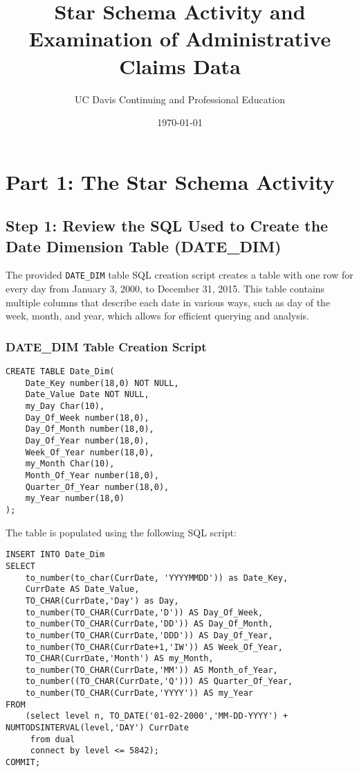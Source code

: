 \documentclass{article}
\title{Star Schema Activity and Examination of Administrative Claims Data}
\author{UC Davis Continuing and Professional Education}
\date{\today}
\begin{document}
\maketitle

\section*{Part 1: The Star Schema Activity}

\subsection*{Step 1: Review the SQL Used to Create the Date Dimension Table (DATE\_DIM)}

The provided \texttt{DATE\_DIM} table SQL creation script creates a table with one row for every day from January 3, 2000, to December 31, 2015. This table contains multiple columns that describe each date in various ways, such as day of the week, month, and year, which allows for efficient querying and analysis.

\subsubsection*{DATE\_DIM Table Creation Script}
\begin{verbatim}
CREATE TABLE Date_Dim(
    Date_Key number(18,0) NOT NULL,
    Date_Value Date NOT NULL,
    my_Day Char(10),
    Day_Of_Week number(18,0),
    Day_Of_Month number(18,0),
    Day_Of_Year number(18,0),
    Week_Of_Year number(18,0),
    my_Month Char(10),
    Month_Of_Year number(18,0),
    Quarter_Of_Year number(18,0),
    my_Year number(18,0)
);
\end{verbatim}

The table is populated using the following SQL script:
\begin{verbatim}
INSERT INTO Date_Dim
SELECT 
    to_number(to_char(CurrDate, 'YYYYMMDD')) as Date_Key,
    CurrDate AS Date_Value,
    TO_CHAR(CurrDate,'Day') as Day,
    to_number(TO_CHAR(CurrDate,'D')) AS Day_Of_Week,
    to_number(TO_CHAR(CurrDate,'DD')) AS Day_Of_Month,
    to_number(TO_CHAR(CurrDate,'DDD')) AS Day_Of_Year,
    to_number(TO_CHAR(CurrDate+1,'IW')) AS Week_Of_Year,
    TO_CHAR(CurrDate,'Month') AS my_Month,
    to_number(TO_CHAR(CurrDate,'MM')) AS Month_of_Year,
    to_number((TO_CHAR(CurrDate,'Q'))) AS Quarter_Of_Year,
    to_number(TO_CHAR(CurrDate,'YYYY')) AS my_Year
FROM 
    (select level n, TO_DATE('01-02-2000','MM-DD-YYYY') + NUMTODSINTERVAL(level,'DAY') CurrDate
     from dual
     connect by level <= 5842);
COMMIT;
\end{verbatim}
\end{document}
